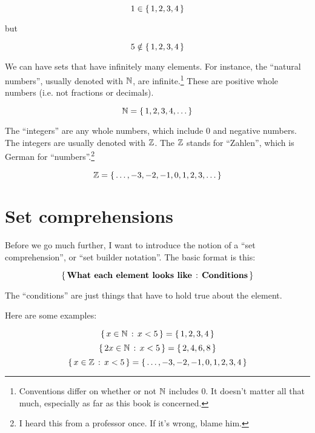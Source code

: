 \begin{displaymath}
  1 \in \left\{ \, 1,2,3,4 \, \right\}
\end{displaymath}

but

\begin{displaymath}
  5 \notin \left\{ \, 1,2,3,4 \, \right\}
\end{displaymath}

We can have sets that have infinitely many elements. For instance, the
``natural numbers'', usually denoted with $\mathbb{N}$, are
infinite.\footnote{Conventions differ on whether or not $\mathbb{N}$ includes
  $0$. It doesn't matter all that much, especially as far as this book
  is concerned.} These are positive whole numbers (i.e. not fractions
or decimals).

\begin{displaymath}
  \mathbb{N} = \left\{ \, 1,2,3,4,\dots \, \right\}
\end{displaymath}

The ``integers'' are any whole numbers, which include $0$ and negative
numbers. The integers are usually denoted with $\mathbb{Z}$. The $\mathbb{Z}$ stands
for ``Zahlen'', which is German for ``numbers''.\footnote{I heard this
  from a professor once. If it's wrong, blame him.}

\begin{displaymath}
  \mathbb{Z} = \left\{ \, \dots, -3, -2, -1, 0, 1, 2, 3, \dots \, \right\}
\end{displaymath}

\section{Set comprehensions}

Before we go much further, I want to introduce the notion of a ``set
comprehension'', or ``set builder notation''. The basic format is this:

\begin{displaymath}
  \left\{ \,  \text{\textbf{What each element looks like}} \, : \, \text{\textbf{Conditions}}  \, \right\}
\end{displaymath}

The ``conditions'' are just things that have to hold true about the
element.

Here are some examples:

\begin{displaymath}
  \left\{ \,  x \in \mathbb{N} \, : \, x < 5  \, \right\} = \left\{ \, 1,2,3,4 \, \right\}
\end{displaymath}
\begin{displaymath}
  \left\{ \,  2x \in \mathbb{N} \, : \, x < 5  \, \right\} = \left\{ \, 2,4,6,8 \, \right\}
\end{displaymath}
\begin{displaymath}
  \left\{ \,  x \in \mathbb{Z} \, : \, x < 5  \, \right\} = \left\{ \, \dots,-3,-2,-1,0,1,2,3,4 \, \right\}
\end{displaymath}

